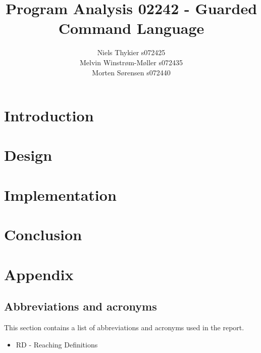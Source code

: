 \documentclass{report}
\title{Program Analysis 02242 - Guarded Command Language}
\author{Niels Thykier s072425\\Melvin Winstrøm-Møller s072435\\Morten Sørensen s072440}
\begin{document}
\parindent 0pt
\parskip 3mm
\setlength{\parindent}{0.5cm}
\newcommand{\docpar}[0]{\vspace{0.5cm} \noindent}
\newcommand{\footref}[1]{\footnotemark[\ref{#1}]}
\newcommand{\newconcept}[1]{\textit{#1}}
\newcommand{\command}[1]{\textbf{#1}}

\maketitle
{}
{}
\tableofcontents
\newpage
{}
{}
\listoffigures
\newpage

\chapter{Introduction}



\chapter{Design}











\chapter{Implementation}

\chapter{Conclusion}



\chapter{Appendix}

\section{Abbreviations and acronyms}

This section contains a list of abbreviations and acronyms used in
the report.

\begin{itemize}
\item RD - Reaching Definitions
\end{itemize}
\end{document}
